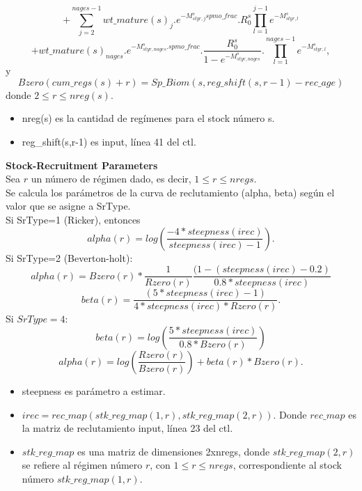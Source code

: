 \documentclass{article}
\begin{document}
\begin{equation*}
    +\sum_{j=2}^{nages-1}wt\_mature(s)_j.e^{-M^s_{styr,j} spmo\_frac}.R^s_0\prod_{l=1}^{j-1}e^{-M^s_{styr,l}} 
\end{equation*}
\begin{equation*}
    + wt\_mature(s)_{nages}.e^{-M^s_{styr,nages}.spmo\_frac}.\dfrac{R^s_0}{1-e^{-M^s_{styr,nages}}}.\prod_{l=1}^{nages-1}e^{-M^s_{styr,l}},
\end{equation*}
y
\begin{equation}
    Bzero(cum\_regs(s)+r) = Sp\_Biom(s,reg\_shift(s,r-1)-rec\_age)
\end{equation}
donde $2\leq r \leq nreg(s)$.
\begin{itemize}
    \item nreg(s) es la cantidad de regímenes para el stock número s.
    \item reg\_shift(s,r-1) es input, línea 41 del ctl.
\end{itemize}
\textbf{Stock-Recruitment Parameters}\\
Sea $r$ un número de régimen dado, es decir, $1\leq r \leq nregs$.\\
Se calcula los parámetros de la curva de reclutamiento (alpha, beta) según el valor que se asigne a SrType.\\
Si SrType=1 (Ricker), entonces
\begin{equation}
alpha(r)=log\left(\dfrac{-4*steepness(irec)}{steepness(irec)-1}\right).
\end{equation}
Si SrType=2 (Beverton-holt):
\begin{equation}
    alpha(r) = Bzero(r)*\dfrac{1}{Rzero(r)}\dfrac{(1-(steepness(irec)-0.2)}{0.8*steepness(irec)}
\end{equation}
\begin{equation}
    beta(r)=\dfrac{(5*steepness(irec)-1)}{4*steepness(irec)*Rzero(r)}.
\end{equation}
Si $SrType=4$:
\begin{equation}
    beta(r)=log\left(\dfrac{5*steepness(irec)}{0.8*Bzero(r)}\right)
\end{equation}
\begin{equation}
    alpha(r)=log\left(\dfrac{Rzero(r)}{Bzero(r)}\right)+beta(r)*Bzero(r).
\end{equation}
\begin{itemize}
    \item steepness es parámetro a estimar.
    \item $irec=rec\_map(stk\_reg\_map(1,r),stk\_reg\_map(2,r))$. Donde $rec\_map$ es la matriz de reclutamiento input, línea 23 del ctl.
    \item $stk\_reg\_map$ es una matriz de dimensiones 2xnregs, donde $stk\_reg\_map(2,r)$ se refiere al régimen número $r$, con $1\leq r \leq nregs$, correspondiente al stock número $stk\_reg\_map(1,r)$.
\end{itemize}
\end{document}
